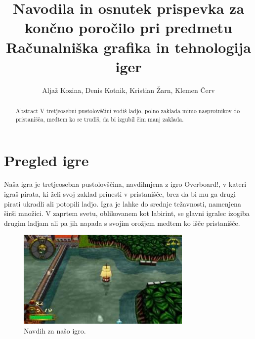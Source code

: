 \documentclass[a4paper]{article}
\begin{document}
\title{Navodila in osnutek prispevka za končno poročilo pri predmetu Računalniška grafika in tehnologija iger}

\author{Aljaž Kozina, Denis Kotnik, Kristian Žarn, Klemen Červ}



\maketitle


\begin{abstract}{Abstract}
V tretjeosebni pustolovščini vodiš ladjo, polno zaklada mimo nasprotnikov do pristanišča, medtem ko se trudiš, da bi izgubil čim manj zaklada.
\end{abstract}



\section{Pregled igre}
Naša igra je tretjeosebna pustolovščina, navdihnjena z igro Overboard!\cite{wiki:Overboard!}, v kateri igraš pirata, ki želi svoj zaklad prinesti v pristanišče, brez da bi mu ga drugi pirati ukradli ali potopili ladjo. Igra je lahke do srednje težavnosti, namenjena širši množici. V zaprtem svetu, oblikovanem kot labirint, se glavni igralec izogiba drugim ladjam ali pa jih napada s svojim orožjem medtem ko išče pristanišče.

\begin{figure}[H]
    \begin{center}
        \includegraphics[width=\columnwidth]{Overboard.jpg}
        \caption{Navdih za našo igro.} \label{fig:slika}
    \end{center}
\end{figure}
\end{document}
